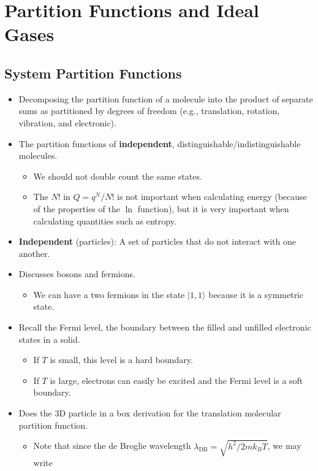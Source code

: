 \documentclass[../notes.tex]{subfiles}
\begin{document}
\chapter{Partition Functions and Ideal Gases}
\section{System Partition Functions}
\begin{itemize}
    \item {}Decomposing the partition function of a molecule into the product of separate sums as partitioned by degrees of freedom (e.g., translation, rotation, vibration, and electronic).
    \item The partition functions of \textbf{independent}, distinguishable/indistinguishable molecules.
    \begin{itemize}
        \item We should not double count the same states.
        \item The $N!$ in $Q=q^N/N!$ is not important when calculating energy (because of the properties of the $\ln$ function), but it is very important when calculating quantities such as entropy.
    \end{itemize}
    \item \textbf{Independent} (particles): A set of particles that do not interact with one another.
    \item Discusses bosons and fermions.
    \begin{itemize}
        \item We can have a two fermions in the state $|1,1\rangle$ because it is a symmetric state.
    \end{itemize}
    \item Recall the Fermi level, the boundary between the filled and unfilled electronic states in a solid.
    \begin{itemize}
        \item If $T$ is small, this level is a hard boundary.
        \item If $T$ is large, electrons can easily be excited and the Fermi level is a soft boundary.
    \end{itemize}
    \item Does the 3D particle in a box derivation for the translation molecular partition function.
    \begin{itemize}
        \item Note that since the de Broglie wavelength $\lambda_\text{DB}=\sqrt{h^2/2mk_BT}$, we may write

\end{itemize}
\end{itemize}
\end{document}
